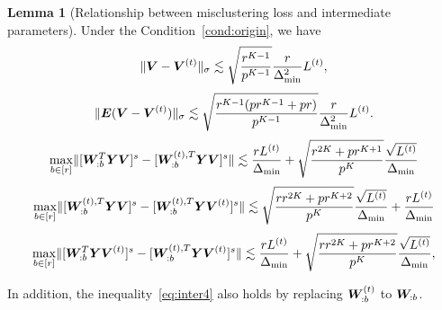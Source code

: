 \documentclass[lettersize,onecolumn,journal]{IEEEtran}
\theoremstyle{definition}
\newtheorem{lem}{Lemma}
\theoremstyle{definition}
\begin{document}
     \begin{lem}[Relationship between misclustering loss and intermediate parameters]\label{lem:intermediate} Under the Condition~\ref{cond:origin}, we have
    \begin{equation}\label{eq:inter1}
        \onormSize{}{\mV - \mV^{(t)}}_{\sigma} \lesssim \sqrt{\frac{r^{K-1}}{p^{K-1}}}  \frac{r}{\Delta_{\min}^2} L^{(t)},
    \end{equation}
    \begin{equation}\label{eq:inter2}
        \onormSize{}{\mE (\mV - \mV^{(t)})}_{\sigma} \lesssim \sqrt{ \frac{r^{K-1}(p r^{K-1} + p r)}{p^{K-1}}} 
 \frac{r}{\Delta_{\min}^2} L^{(t)}.    
 \end{equation}
 \begin{equation}\label{eq:inter3}
     \max_{b \in [r]} \onormSize{}{ [ \mW_{:b}^T \mY \mV ]^s   -  [ \mW_{:b}^{(t), T} \mY \mV  ]^s } \lesssim \frac{r L^{(t)}}{\Delta_{\min}} + \sqrt{ \frac{r^{2K} + pr^{K+1}}{p^{K}} } \frac{\sqrt{L^{(t)}}}{\Delta_{\min}}
 \end{equation}
 \begin{equation}\label{eq:inter4}
     \max_{b \in [r]} \onormSize{}{  [  \mW_{:b}^{(t), T}  \mY \mV]^s - [  \mW_{:b}^{(t), T}  \mY \mV^{(t)}]^s } \lesssim  \sqrt{ \frac{rr^{2K} + p r^{K+2}}{p^{K}}}  \frac{\sqrt{L^{(t)}}}{\Delta_{\min}} +  \frac{r L^{(t)}}{\Delta_{\min}}
     \end{equation}
    \begin{equation}\label{eq:inter5}
         \max_{b \in [r]} \onormSize{}{ [\mW_{:b}^T \mY \mV^{(t)} ]^s   -  [ \mW_{:b}^{(t), T} \mY \mV^{(t)} ]^s } \lesssim \frac{rL^{(t)}}{\Delta_{\min}} + \sqrt{ \frac{rr^{2K} + p r^{K+2}}{p^{K}}}  \frac{\sqrt{L^{(t)}}}{\Delta_{\min}},
    \end{equation}
    
    In addition, the inequality~\eqref{eq:inter4} also holds by replacing $\bm{W}_{:b}^{(t)}$ to $\bm{W}_{:b}$.
    \end{lem}
        
\end{document}
